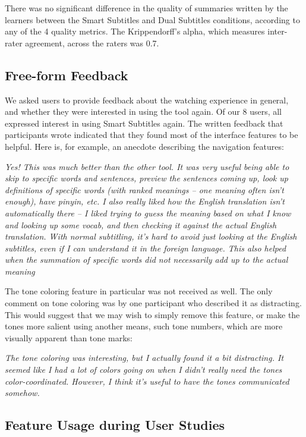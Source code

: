 \documentclass{sigchi}
\begin{document}
There was no significant difference in the quality of summaries written
by the learners between the Smart Subtitles and Dual Subtitles conditions,
according to any of the 4 quality metrics. The Krippendorff's alpha,
which measures inter-rater agreement, across the raters was 0.7.

\subsection{Free-form Feedback}

We asked users to provide feedback about the watching experience in general, and whether they were interested in using the tool again. Of our 8 users, all expressed interest in using Smart Subtitles again. The written feedback that participants wrote indicated that they found most of the interface features to be helpful. Here is, for example, an anecdote describing the navigation features:
	 	 	
\emph{Yes! This was much better than the other tool. It was very useful being able to skip to specific words and sentences, preview the sentences coming up, look up definitions of specific words (with ranked meanings – one meaning often isn't enough), have pinyin, etc. I also really liked how the English translation isn't automatically there – I liked trying to guess the meaning based on what I know and looking up some vocab, and then checking it against the actual English translation. With normal subtitling, it's hard to avoid just looking at the English subtitles, even if I can understand it in the foreign language. This also helped when the summation of specific words did not necessarily add up to the actual meaning}

The tone coloring feature in particular was not received as well. The only comment on tone coloring was by one participant who described it as distracting. This would suggest that we may wish to simply remove this feature, or make the tones more salient using another means, such tone numbers, which are more visually apparent than tone marks:
	 	 	
\emph{The tone coloring was interesting, but I actually found it a bit distracting. It seemed like I had a lot of colors going on when I didn't really need the tones color-coordinated. However, I think it's useful to have the tones communicated somehow.}

\subsection{Feature Usage during User Studies}
\end{document}
